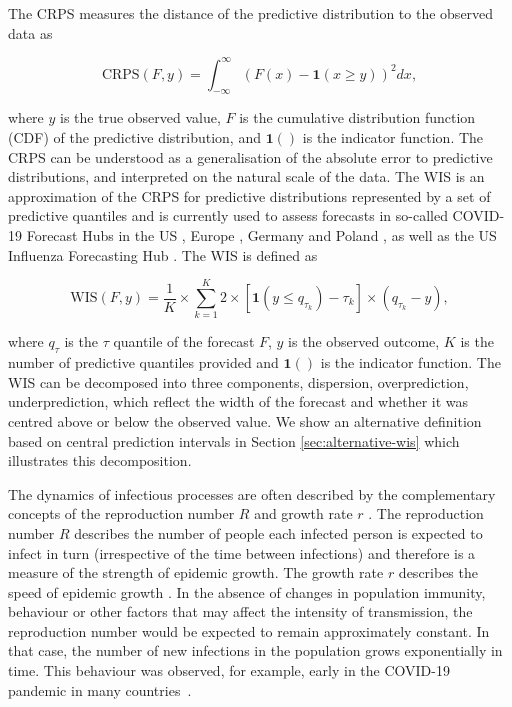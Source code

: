 \documentclass{article}
\begin{document}
The CRPS measures the distance of the predictive distribution to the observed data as 
\begin{linenomath*}
\begin{equation}
    \text{CRPS}(F, y) = \int_{-\infty}^\infty \left( F(x) - \boldsymbol{1}(x \geq y) \right)^2 dx,
\end{equation}    
\end{linenomath*}
where $y$ is the true observed value, $F$ is the cumulative distribution function (CDF) of the predictive distribution, and $\boldsymbol{1}()$ is the indicator function. The CRPS can be understood as a generalisation of the absolute error to predictive distributions, and interpreted on the natural scale of the data. The WIS is an approximation of the CRPS for predictive distributions represented by a set of predictive quantiles and is currently used to assess forecasts in so-called COVID-19 Forecast Hubs in the US \citep{cramerCOVID19ForecastHub2020, cramerEvaluationIndividualEnsemble2021}, Europe \citep{sherrattPredictivePerformanceMultimodel2022}, Germany and Poland \citep{bracherShorttermForecastingCOVID192021, bracherNationalSubnationalShortterm2021}, as well as the US Influenza Forecasting Hub \citep{CdcepiFlusightforecastdata2022}. The WIS is defined as 
\begin{linenomath*}
\begin{equation}
    \text{WIS}(F, y) = \frac{1}{K} \times \sum_{k = 1}^{K} 2 \times \left[ \boldsymbol{1}(y \leq q_{\tau_k}) - \tau_k \right] \times ( q_{\tau_k} - y), 
\end{equation}
\end{linenomath*}
where $q_{\tau}$ is the $\tau$ quantile of the forecast $F$, $y$ is the observed outcome, $K$ is the number of predictive quantiles provided and $\boldsymbol{1}()$ is the indicator function. The WIS can be decomposed into three components, dispersion, overprediction, underprediction, which reflect the width of the forecast and whether it was centred above or below the observed value. We show an alternative definition based on central prediction intervals in Section \ref{sec:alternative-wis} which illustrates this decomposition. 

The dynamics of infectious processes are often described by the complementary concepts of the reproduction number $R$ \citep{gosticPracticalConsiderationsMeasuring2020} and growth rate $r$ \citep{wallingaHowGenerationIntervals2007}. The reproduction number $R$ describes the number of people each infected person is expected to infect in turn (irrespective of the time between infections) and therefore is a measure of the strength of epidemic growth. The growth rate $r$ describes the speed of epidemic growth \citep{dushoffSpeedStrengthEpidemic2021}.
In the absence of changes in population immunity, behaviour or other factors that may affect the intensity of transmission, the reproduction number would be expected to remain approximately constant.
In that case, the number of new infections in the population grows exponentially in time.
This behaviour was observed, for example, early in the COVID-19 pandemic in many countries~\citep{pellisChallengesControlCOVID192021}.
\end{document}
